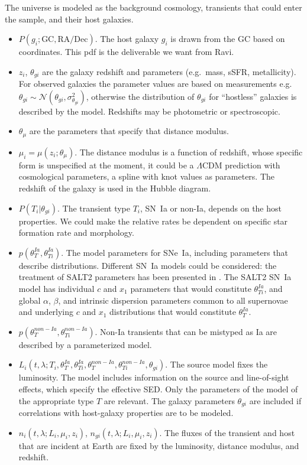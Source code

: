 \documentclass[preprint]{aastex}
\begin{document}
The universe is modeled as the background cosmology, transients that could
enter the sample, and their host galaxies.
\begin{itemize}
\item $P(g_i ; \text{GC}, {\text{RA}}/{\text{Dec}})$. The host galaxy $g_i$
is drawn from the GC based on coordinates.
This pdf is
the deliverable we want from Ravi.
\item $z_i$, $\theta_{gi}$ are the galaxy redshift and parameters (e.g.\ mass, sSFR, metallicity).
For observed galaxies the parameter values are based on measurements e.g.\ $\theta_{gi} \sim \mathcal{N}({\theta}_{gi},\sigma^2_{{\theta}_{gi}})$, otherwise the distribution
of $\theta_{gi}$ for ``hostless'' galaxies is described by the model.
Redshifts may be photometric or spectroscopic.
\item $\theta_\mu$ are the parameters that specify that distance modulus.
\item $\mu_i=\mu(z_i; \theta_\mu)$.  The distance modulus is a function of redshift,
whose specific form is unspecified at the moment,  it could
be a $\Lambda$CDM prediction with cosmological parameters, a spline with knot values
as parameters.
The redshift of the galaxy is used in the Hubble diagram.
\item $P(T_i | \theta_{gi})$.  The transient type $T_i$, SN~Ia or non-Ia, depends
on the host properties.  We could make the relative rates be dependent
on specific star formation rate and morphology.
\item $p(\theta_T^{Ia}, \theta_{Ti}^{Ia})$.  The model parameters for SNe~Ia, including
parameters that describe distributions.
Different SN~Ia models could be considered: the treatment of SALT2 parameters
has been presented in \citet{2011MNRAS.418.2308M}.
The SALT2 SN~Ia
model has individual $c$ and $x_1$ parameters that would constitute $\theta_{Ti}^{Ia}$,
and global $\alpha$, $\beta$, and intrinsic dispersion  parameters  common to all supernovae
 and  underlying  $c$ and $x_1$ distributions that would constitute $\theta_T^{Ia}$.
\item $p(\theta_T^{non-Ia}, \theta_{Ti}^{non-Ia})$.  Non-Ia transients
that can be mistyped as Ia are described by a parameterized model.
\item $L_i(t,\lambda; T_i, \theta_T^{Ia}, \theta_{Ti}^{Ia}, \theta_T^{non-Ia}, \theta_{Ti}^{non-Ia},
\theta_{gi})$.  The source model fixes
the luminosity. The  model includes  information on the
source and line-of-sight effects, which specify the effective SED.   Only the
parameters of the model of the appropriate type $T$ are relevant.  The galaxy parameters
$\theta_{gi}$ are included if correlations with host-galaxy properties are to be modeled.
\item $n_i(t,\lambda; L_i, \mu_i, z_i)$, $n_{gi}(t,\lambda; L_i, \mu_i, z_i)$.  The  fluxes of
the transient and host that are incident at Earth
are fixed by the luminosity, distance modulus, and redshift.
\end{itemize}
\end{document}
